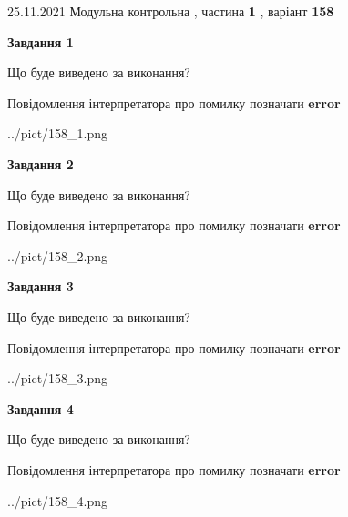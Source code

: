 \documentclass[10pt, ukrainian]{article}
\begin{document}
{25.11.2021 Модульна контрольна , частина \textbf { 1 }, варіант  \No \textbf { 158 }\par}
{
\begin {large}

{\begin {center}\textbf{Завдання 1}\end {center}}\par
Що буде виведено за виконання? \par
Повідомлення інтерпретатора про помилку позначати \textbf{error}

\begin{center}
	{../pict/158_1.png}
\end{center}
\newpage

{\begin {center}\textbf{Завдання 2}\end {center}}\par
Що буде виведено за виконання? \par
Повідомлення інтерпретатора про помилку позначати \textbf{error}

\begin{center}
	{../pict/158_2.png}
\end{center}
\newpage

{\begin {center}\textbf{Завдання 3}\end {center}}\par
Що буде виведено за виконання? \par
Повідомлення інтерпретатора про помилку позначати \textbf{error}

\begin{center}
	{../pict/158_3.png}
\end{center}
\newpage

{\begin {center}\textbf{Завдання 4}\end {center}}\par
Що буде виведено за виконання? \par
Повідомлення інтерпретатора про помилку позначати \textbf{error}

\begin{center}
	{../pict/158_4.png}
\end{center}
\newpage


\end{large}}
\end{document}
